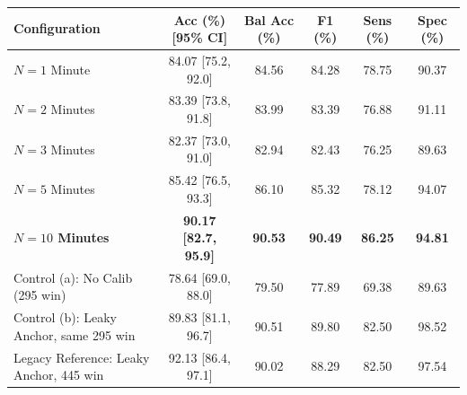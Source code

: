 \begin{tabular}{lccccc}
\toprule
\textbf{Configuration} & \textbf{Acc (\%) [95\% CI]} & \textbf{Bal Acc (\%)} & \textbf{F1 (\%)} & \textbf{Sens (\%)} & \textbf{Spec (\%)} \\
\midrule
$N=1$ Minute  & 84.07 [75.2, 92.0] & 84.56 & 84.28 & 78.75 & 90.37 \\
$N=2$ Minutes  & 83.39 [73.8, 91.8] & 83.99 & 83.39 & 76.88 & 91.11 \\
$N=3$ Minutes  & 82.37 [73.0, 91.0] & 82.94 & 82.43 & 76.25 & 89.63 \\
$N=5$ Minutes  & 85.42 [76.5, 93.3] & 86.10 & 85.32 & 78.12 & 94.07 \\
\textbf{$N=10$ Minutes} & \textbf{90.17 [82.7, 95.9]} & \textbf{90.53} & \textbf{90.49} & \textbf{86.25} & \textbf{94.81} \\
\midrule
Control (a): No Calib (295 win)   & 78.64 [69.0, 88.0] & 79.50 & 77.89 & 69.38 & 89.63 \\
Control (b): Leaky Anchor, same 295 win & 89.83 [81.1, 96.7] & 90.51 & 89.80 & 82.50 & 98.52 \\
Legacy Reference: Leaky Anchor, 445 win & 92.13 [86.4, 97.1] & 90.02 & 88.29 & 82.50 & 97.54 \\
\bottomrule
\end{tabular}
